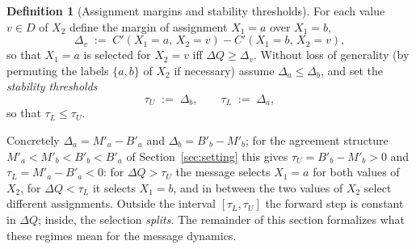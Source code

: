 \documentclass[letterpaper]{article} %
\theoremstyle{definition}
\newtheorem{definition}[theorem]{Definition}
\theoremstyle{remark}
\begin{document}
\begin{definition}[Assignment margins and stability thresholds]\label{def:thresholds}
For each value $v \in D$ of $X_2$ define the margin of assignment $X_1=a$ over $X_1=b$,
\[
    \Delta_v \;:=\; C'(X_1{=}a,\, X_2{=}v) - C'(X_1{=}b,\, X_2{=}v),
\]
so that $X_1=a$ is selected for $X_2=v$ iff $\Delta Q \geq \Delta_v$. Without loss of generality (by permuting the labels $\{a,b\}$ of $X_2$ if necessary) assume $\Delta_a \leq \Delta_b$, and set the \emph{stability thresholds}
\[
    \tau_U \;:=\; \Delta_b, \qquad \tau_L \;:=\; \Delta_a,
\]
so that $\tau_L \leq \tau_U$.
\end{definition}
\noindent Concretely $\Delta_a = M'_a - B'_a$ and $\Delta_b = B'_b - M'_b$; for the agreement structure $M'_a < M'_b < B'_b < B'_a$ of Section~\ref{sec:setting} this gives $\tau_U = B'_b - M'_b > 0$ and $\tau_L = M'_a - B'_a < 0$: for $\Delta Q > \tau_U$ the message selects $X_1=a$ for both values of $X_2$, for $\Delta Q < \tau_L$ it selects $X_1=b$, and in between the two values of $X_2$ select different assignments.  Outside the interval $[\tau_L, \tau_U]$ the forward step is constant in $\Delta Q$; inside, the selection \emph{splits}.  The remainder of this section formalizes what these regimes mean for the message dynamics.
\end{document}
